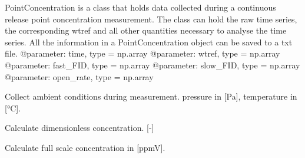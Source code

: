 \documentclass[letterpaper,10pt,english]{sphinxmanual}
\begin{document}
\begin{fulllineitems}
\label{\detokenize{index:windtunnel.PointConcentration}}
PointConcentration is a class that holds data collected during
a continuous release point concentration measurement. The class can hold
the raw time series, the corresponding wtref and all other quantities
necessary to analyse the time series. All the information in a
PointConcentration object can be saved to a txt file.
@parameter: time, type = np.array
@parameter: wtref, type = np.array
@parameter: fast\_FID, type = np.array
@parameter: slow\_FID, type = np.array
@parameter: open\_rate, type = np.array

\begin{fulllineitems}
\label{\detokenize{index:windtunnel.PointConcentration.ambient_conditions}}
Collect ambient conditions during measurement. pressure in {[}Pa{]},
temperature in {[}°C{]}.

\end{fulllineitems}


\begin{fulllineitems}
\label{\detokenize{index:windtunnel.PointConcentration.calc_c_star}}
Calculate dimensionless concentration. {[}-{]}

\end{fulllineitems}


\begin{fulllineitems}
\label{\detokenize{index:windtunnel.PointConcentration.calc_full_scale_concentration}}
Calculate full scale concentration in {[}ppmV{]}.

\end{fulllineitems}


\end{fulllineitems}
\end{document}
